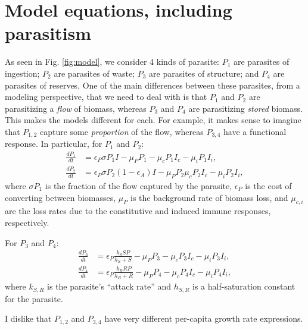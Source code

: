 \documentclass[11pt,reqno,final,pdftex]{amsart}\usepackage[]{graphicx}\usepackage[]{color}
\theoremstyle{plain}
\numberwithin{equation}{part}
\begin{document}
\section*{Model equations, including parasitism}
As seen in Fig. \ref{fig:model}, we consider 4 kinds of parasite: $P_1$ are parasites of ingestion; $P_2$ are parasites of waste; $P_3$ are parasites of structure; and $P_4$ are parasites of reserves.
One of the main differences between these parasites, from a modeling perspective, that we need to deal with is that $P_1$ and $P_2$ are parasitizing a \emph{flow} of biomass, whereas $P_3$ and $P_4$ are parasitizing \emph{stored} biomass.
This makes the models different for each.
For example, it makes sense to imagine that $P_{1,2}$ capture some \emph{proportion} of the flow, whereas $P_{3,4}$ have a functional response.
In particular, for $P_1$ and $P_2$:
\begin{align}
\frac{dP_1}{dt} &= \epsilon_P \sigma P_1 I - \mu_P P_1 - \mu_c P_1 I_c - \mu_i P_1 I_i,\\
\frac{dP_2}{dt} &= \epsilon_P \sigma P_2 (1-\epsilon_A) I - \mu_P P_2  \mu_c P_2 I_c - \mu_i P_2 I_i,
\end{align}
where $\sigma P_1$ is the fraction of the flow captured by the parasite, $\epsilon_P$ is the cost of converting between biomasses, $\mu_P$ is the background rate of biomass loss, and $\mu_{c,i}$ are the loss rates due to the constitutive and induced immune responses, respectively.

For $P_3$ and $P_4$:
\begin{align}
\frac{dP_3}{dt} &= \epsilon_P \frac{k_S S P}{h_S + S} - \mu_P P_3 - \mu_c P_3 I_c - \mu_i P_3 I_i,\\
\frac{dP_4}{dt} &= \epsilon_P \frac{k_R R P}{h_R + R} - \mu_P P_4 - \mu_c P_4 I_c - \mu_i P_4 I_i,
\end{align}
where $k_{S,R}$ is the parasite's ``attack rate'' and $h_{S,R}$ is a half-saturation constant for the parasite.

I dislike that $P_{1,2}$ and $P_{3,4}$ have very different per-capita growth rate expressions.



\end{document}
